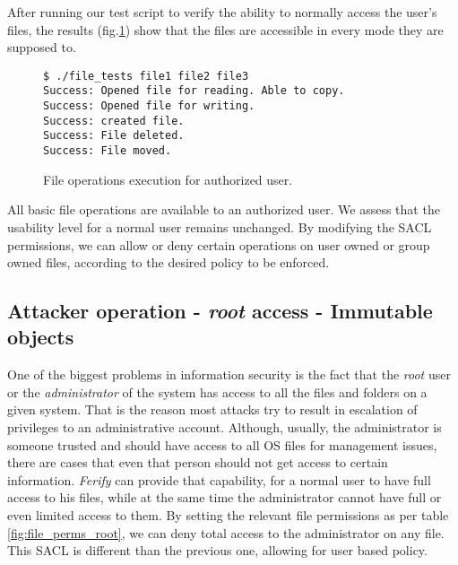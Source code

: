 \par After running our test script to verify the ability to normally access the user's files, the results (fig.\ref{fig:results1}) show that the files are accessible in every mode they are supposed to.

\begin{figure}[ht]
	\centering
	\footnotesize{\selectfont 
		\begin{lstlisting}
$ ./file_tests file1 file2 file3
Success: Opened file for reading. Able to copy.
Success: Opened file for writing.
Success: created file.
Success: File deleted.
Success: File moved.
		\end{lstlisting}}
	\caption{File operations execution for authorized user.}
	\label{fig:results1}
\end{figure}

\par All basic file operations are available to an authorized user. We assess that the usability level for a normal user remains unchanged. By modifying the \ac{SACL} permissions, we can allow or deny certain operations on user owned or group owned files, according to the desired policy to be enforced.

\subsection{Attacker operation - \emph{root} access - Immutable objects}

\par One of the biggest problems in information security is the fact that the \emph{root} user or the \emph{administrator} of the system has access to all the files and folders on a given system. That is the reason most attacks try to result in escalation of privileges to an administrative account. Although, usually, the administrator is someone trusted and should have access to all \ac{OS} files for management issues, there are cases that even that person should not get access to certain information. \emph{Ferify} can provide that capability, for a normal user to have full access to his files, while at the same time the administrator cannot have full or even limited access to them. By setting the relevant file permissions as per table \ref{fig:file_perms_root}, we can deny total access to the administrator on any file. This \ac{SACL} is different than the previous one, allowing for user based policy.

